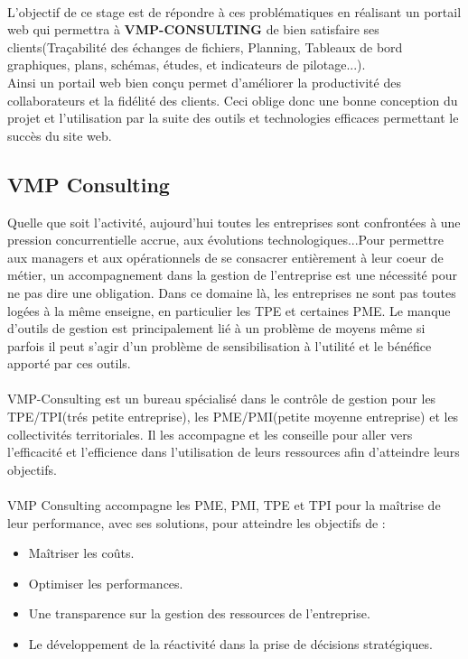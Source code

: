 \documentclass[12pt]{article}
\begin{document}
\\

L’objectif de ce stage est de répondre à ces problématiques en réalisant un portail web qui permettra
 à \textbf{VMP-CONSULTING} de bien satisfaire ses clients(Traçabilité des échanges de fichiers, Planning, Tableaux de bord graphiques, plans, schémas, études, et indicateurs de pilotage...).\\
Ainsi un portail web bien conçu permet d’améliorer la productivité des collaborateurs et la fidélité des clients.
Ceci oblige donc une bonne conception du projet et  l'utilisation par la suite  des  outils et technologies efficaces permettant  
 le succès du site web.\\ 


\subsection{VMP Consulting}


Quelle que soit l’activité, aujourd’hui toutes les entreprises sont confrontées à une pression concurrentielle accrue, aux évolutions technologiques...Pour permettre aux managers et aux opérationnels de se consacrer entièrement à leur coeur de métier, un accompagnement dans la gestion de l'entreprise est une nécessité pour ne pas dire une obligation. Dans ce domaine là, les entreprises ne sont pas toutes logées à la même enseigne, en particulier les TPE et certaines PME. Le manque d’outils de gestion est principalement lié à un problème de moyens même si parfois il peut s’agir d’un problème de sensibilisation à l’utilité et le bénéfice apporté par ces outils.\\ \\

VMP-Consulting est un bureau spécialisé dans le contrôle de gestion pour les TPE/TPI(trés petite entreprise), les PME/PMI(petite moyenne entreprise) et les collectivités territoriales. Il les accompagne et les conseille pour aller vers l'efficacité et l'efficience dans l'utilisation de leurs ressources afin d'atteindre leurs objectifs.\\ \\


VMP Consulting accompagne les PME, PMI, TPE et TPI pour la maîtrise de leur performance, avec ses solutions, pour atteindre les objectifs de :
\begin{itemize}

\item Maîtriser les coûts.

\item Optimiser les performances.

\item Une transparence sur la gestion des ressources de  l'entreprise.

\item Le développement de la réactivité dans la prise de décisions stratégiques.
\end{itemize}
\\ \\ 
\end{document}
